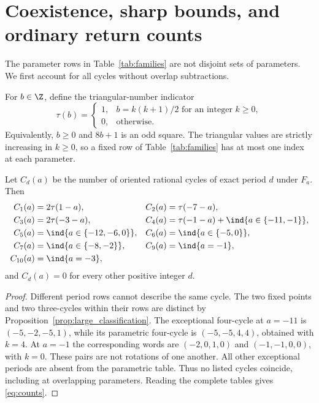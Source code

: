\section{Coexistence, sharp bounds, and ordinary return counts}
\label{sec:counts}

The parameter rows in Table~\ref{tab:families} are not disjoint
sets of parameters. We first account for all cycles without
overlap subtractions.

For $b\in\Z$, define the triangular-number indicator
\begin{equation}
 \tau(b)=
 \begin{cases}
 1,& b=k(k+1)/2\text{ for an integer }k\ge0,\\
 0,&\text{otherwise}.
 \end{cases}
 \label{eq:tau}
\end{equation}
Equivalently, $b\ge0$ and $8b+1$ is an odd square.
The triangular values are strictly increasing in $k\ge0$,
so a fixed row of Table~\ref{tab:families} has at most one
index at each parameter.

\begin{proposition}
\label{prop:counts}
Let $C_d(a)$ be the number of oriented rational cycles of exact
period $d$ under $F_a$. Then
\begin{align}
 C_1(a)&=2\tau(1-a),& C_2(a)&=\tau(-7-a),\notag\\
 C_3(a)&=2\tau(-3-a),&
 C_4(a)&=\tau(-1-a)+\ind{a\in\{-11,-1\}},\notag\\
 C_5(a)&=\ind{a\in\{-12,-6,0\}},&
 C_6(a)&=\ind{a\in\{-5,0\}},\notag\\
 C_7(a)&=\ind{a\in\{-8,-2\}},&
 C_9(a)&=\ind{a=-1},\notag\\
 C_{10}(a)&=\ind{a=-3},&&
 \label{eq:counts}
\end{align}
and $C_d(a)=0$ for every other positive integer $d$.
\end{proposition}
\begin{proof}
Different period rows cannot describe the same cycle.
The two fixed points and two three-cycles within their rows are
distinct by Proposition~\ref{prop:large_classification}.
The exceptional four-cycle at $a=-11$ is
$(-5,-2,-5,1)$, while its parametric four-cycle is
$(-5,-5,4,4)$, obtained with $k=4$.
At $a=-1$ the corresponding words are $(-2,0,1,0)$ and
$(-1,-1,0,0)$, with $k=0$.
These pairs are not rotations of one another.
All other exceptional periods are absent from the parametric table.
Thus no listed cycles coincide, including at overlapping parameters.
Reading the complete tables gives \eqref{eq:counts}.
\end{proof}


